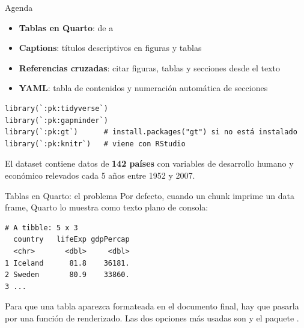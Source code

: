 \documentclass[8pt]{beamer}
\begin{document}
	\subtitle{12mo encuentro: Quarto II}

	\begin{frame}[plain]
		\maketitle
	\end{frame}


	\begin{frame}[fragile]{Agenda}
		\begin{itemize}
			\item \textbf{Tablas en Quarto}: de  a 
			\item \textbf{Captions}: títulos descriptivos en figuras y tablas
			\item \textbf{Referencias cruzadas}: citar figuras, tablas y secciones desde el texto
			\item \textbf{YAML}: tabla de contenidos y numeración automática de secciones
		\end{itemize}


\begin{lstlisting}[style=RScript]
library(`:pk:tidyverse`)
library(`:pk:gapminder`)
library(`:pk:gt`)      # install.packages("gt") si no está instalado
library(`:pk:knitr`)   # viene con RStudio
\end{lstlisting}

		\begin{block}{}
			El dataset  contiene datos de \textbf{142 países} con variables de desarrollo humano y económico relevados cada 5 años entre 1952 y 2007.
		\end{block}
	\end{frame}


	\begin{frame}[fragile]{Tablas en Quarto: el problema}
		Por defecto, cuando un chunk imprime un data frame, Quarto lo muestra como texto plano de consola:

\begin{lstlisting}
# A tibble: 5 x 3
  country   lifeExp gdpPercap
  <chr>       <dbl>     <dbl>
1 Iceland      81.8    36181.
2 Sweden       80.9    33860.
3 ...
\end{lstlisting}

		\begin{alertblock}{}
			Para que una tabla aparezca formateada en el documento final, hay que pasarla por una función de renderizado. Las dos opciones más usadas son  y el paquete .
		\end{alertblock}
	\end{frame}
\end{document}
